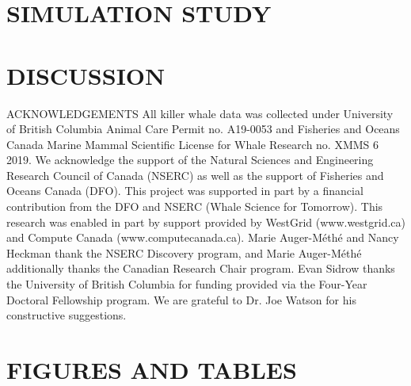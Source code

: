 \documentclass{TD-CJS}
\begin{document}
\section{SIMULATION STUDY}
\label{sec:sim_study}

%
\section{DISCUSSION}

%
\begin{ack}{ACKNOWLEDGEMENTS}
All killer whale data was collected under University of British Columbia Animal Care Permit no. A19-0053 and Fisheries and Oceans Canada Marine Mammal Scientific License for Whale Research no. XMMS 6 2019.
We acknowledge the support of the Natural Sciences and Engineering Research Council of Canada (NSERC) as well as the support of Fisheries and Oceans Canada (DFO). This project was supported in part by a financial contribution from the DFO and NSERC (Whale Science for Tomorrow).
This research was enabled in part by support provided by WestGrid (www.westgrid.ca) and Compute Canada (www.computecanada.ca).
Marie Auger-M\'eth\'e and Nancy Heckman thank the NSERC Discovery program, and Marie Auger-M\'eth\'e additionally thanks the Canadian Research Chair program.
Evan Sidrow thanks the University of British Columbia for funding provided via the Four-Year Doctoral Fellowship program.
We are grateful to Dr. Joe Watson for his constructive suggestions.
\end{ack}
%
\newpage

%
\newpage
\begin{appendix}

\end{appendix}
%
\newpage
\section{FIGURES AND TABLES}

%
\end{document}
